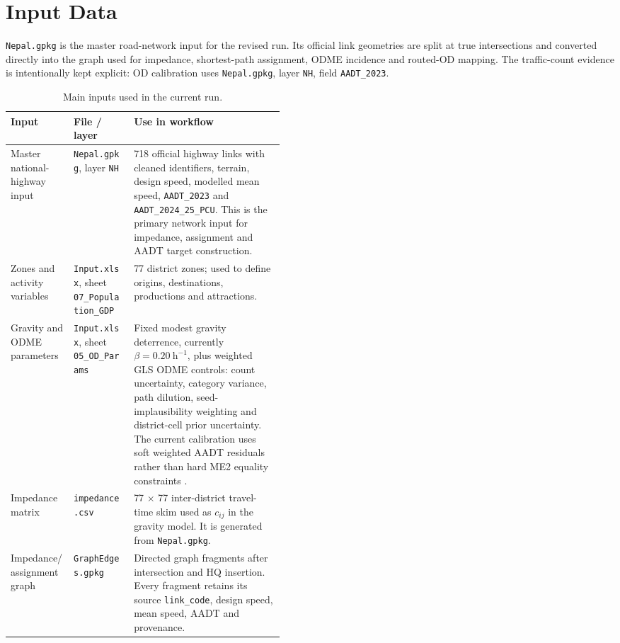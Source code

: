 \documentclass[11pt,a4paper]{article}
\begin{document}
\section{Input Data}

\texttt{Nepal.gpkg} is the master road-network input for the revised run.
Its official link geometries are split at true intersections and converted
directly into the graph used for impedance, shortest-path assignment, ODME
incidence and routed-OD mapping. The traffic-count evidence is intentionally
kept explicit: OD calibration uses \texttt{Nepal.gpkg}, layer
\texttt{NH}, field \texttt{AADT\_2023}.

\begin{table}[H]
\centering
\caption{Main inputs used in the current run.}
\small
\begin{tabularx}{\linewidth}{L{0.23\linewidth} L{0.22\linewidth} Y}
\toprule
\textbf{Input} & \textbf{File / layer} & \textbf{Use in workflow} \\
\midrule
Master national-highway input &
\texttt{Nepal.gpkg}, layer \texttt{NH} &
718 official highway links with cleaned identifiers, terrain, design speed,
modelled mean speed, \texttt{AADT\_2023} and \texttt{AADT\_2024\_25\_PCU}. This
is the primary network input for impedance, assignment and AADT target
construction. \\
\addlinespace
Zones and activity variables &
\texttt{Input.xlsx}, sheet \texttt{07\_Population\_GDP} &
77 district zones; used to define origins, destinations, productions and
attractions. \\
\addlinespace
Gravity and ODME parameters &
\texttt{Input.xlsx}, sheet \texttt{05\_OD\_Params} &
Fixed modest gravity deterrence, currently $\beta=0.20~\mathrm{h}^{-1}$, plus
weighted GLS ODME controls: count uncertainty, category variance, path dilution,
seed-implausibility weighting and district-cell prior uncertainty. The current
calibration uses soft weighted AADT residuals rather than hard ME2 equality
constraints \cite{cascetta1984,spiess1990}. \\
\addlinespace
Impedance matrix &
\texttt{impedance.csv} &
77 $\times$ 77 inter-district travel-time skim used as $c_{ij}$ in the gravity
model. It is generated from \texttt{Nepal.gpkg}. \\
\addlinespace
Impedance/assignment graph &
\texttt{GraphEdges.gpkg} &
Directed graph fragments after intersection and HQ insertion. Every
fragment retains its source \texttt{link\_code}, design speed, mean speed, AADT and
provenance. \\

\end{tabularx}
\end{table}
\end{document}
